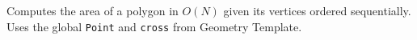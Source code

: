 
Computes the area of a polygon in $O(N)$ given its vertices ordered sequentially. Uses the global \lstinline|Point| and \lstinline|cross| from Geometry Template.


